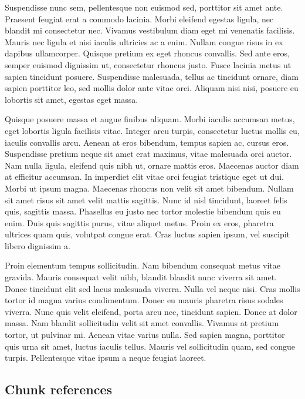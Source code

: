 \documentclass[
  english,
  man,floatsintext]{apa6}
\begin{document}
Suspendisse nunc sem, pellentesque non euismod sed, porttitor sit amet ante. Praesent feugiat erat a commodo lacinia. Morbi eleifend egestas ligula, nec blandit mi consectetur nec. Vivamus vestibulum diam eget mi venenatis facilisis. Mauris nec ligula et nisi iaculis ultricies ac a enim. Nullam congue risus in ex dapibus ullamcorper. Quisque pretium ex eget rhoncus convallis. Sed ante eros, semper euismod dignissim ut, consectetur rhoncus justo. Fusce lacinia metus ut sapien tincidunt posuere. Suspendisse malesuada, tellus ac tincidunt ornare, diam sapien porttitor leo, sed mollis dolor ante vitae orci. Aliquam nisi nisi, posuere eu lobortis sit amet, egestas eget massa.

Quisque posuere massa et augue finibus aliquam. Morbi iaculis accumsan metus, eget lobortis ligula facilisis vitae. Integer arcu turpis, consectetur luctus mollis eu, iaculis convallis arcu. Aenean at eros bibendum, tempus sapien ac, cursus eros. Suspendisse pretium neque sit amet erat maximus, vitae malesuada orci auctor. Nam nulla ligula, eleifend quis nibh ut, ornare mattis eros. Maecenas auctor diam at efficitur accumsan. In imperdiet elit vitae orci feugiat tristique eget ut dui. Morbi ut ipsum magna. Maecenas rhoncus non velit sit amet bibendum. Nullam sit amet risus sit amet velit mattis sagittis. Nunc id nisl tincidunt, laoreet felis quis, sagittis massa. Phasellus eu justo nec tortor molestie bibendum quis eu enim. Duis quis sagittis purus, vitae aliquet metus. Proin ex eros, pharetra ultrices quam quis, volutpat congue erat. Cras luctus sapien ipsum, vel suscipit libero dignissim a.

Proin elementum tempus sollicitudin. Nam bibendum consequat metus vitae gravida. Mauris consequat velit nibh, blandit blandit nunc viverra sit amet. Donec tincidunt elit sed lacus malesuada viverra. Nulla vel neque nisi. Cras mollis tortor id magna varius condimentum. Donec eu mauris pharetra risus sodales viverra. Nunc quis velit eleifend, porta arcu nec, tincidunt sapien. Donec at dolor massa. Nam blandit sollicitudin velit sit amet convallis. Vivamus at pretium tortor, ut pulvinar mi. Aenean vitae varius nulla. Sed sapien magna, porttitor quis urna sit amet, luctus iaculis tellus. Mauris vel sollicitudin quam, sed congue turpis. Pellentesque vitae ipsum a neque feugiat laoreet.

\hypertarget{chunk-references}{%
\subsection{Chunk references}\label{chunk-references}}
\end{document}
